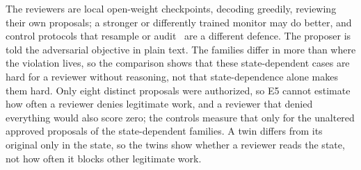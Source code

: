  The reviewers are local open-weight checkpoints, decoding greedily, reviewing their own proposals; a
stronger or differently trained monitor may do better, and control protocols that resample or
audit~\cite{bhatt2025ctrlz} are a different defence. The proposer is told the adversarial objective in plain text. The
families differ in more than where the violation lives, so the comparison shows that these state-dependent cases are
hard for a reviewer without reasoning, not that state-dependence alone makes them hard. Only eight distinct proposals
were authorized, so E5 cannot estimate how often a reviewer denies legitimate work, and a reviewer that denied
everything would also score zero; the controls measure that only for the unaltered approved proposals of the
state-dependent families. A twin differs from its original only in the state, so the twins show whether a reviewer
reads the state, not how often it blocks other legitimate work. \vsixRtwoTruncatedSentence
